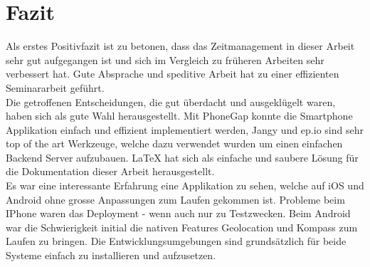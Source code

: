 
\newpage
\section{Fazit} %
\label{sec:Fazit}

Als erstes Positivfazit ist zu betonen, dass das Zeitmanagement in dieser Arbeit sehr gut aufgegangen ist und sich im Vergleich zu früheren Arbeiten sehr verbessert hat. Gute Absprache und speditive Arbeit hat zu einer effizienten Seminararbeit geführt.\\
Die getroffenen Entscheidungen, die gut überdacht und ausgeklügelt waren, haben sich als gute Wahl herausgestellt. Mit PhoneGap konnte die Smartphone Applikation einfach und effizient implementiert werden, Jangy und ep.io sind sehr top of the art Werkzeuge, welche dazu verwendet wurden um einen einfachen Backend Server aufzubauen. LaTeX hat sich als einfache und saubere Lösung für die Dokumentation dieser Arbeit herausgestellt.\\
Es war eine interessante Erfahrung eine Applikation zu sehen, welche auf iOS und Android ohne grosse Anpassungen zum Laufen gekommen ist. Probleme beim IPhone waren das Deployment - wenn auch nur zu Testzwecken. Beim Android war die Schwierigkeit initial die nativen Features Geolocation und Kompass zum Laufen zu bringen. Die Entwicklungsumgebungen sind grundsätzlich für beide Systeme einfach zu installieren und aufzusetzen. 

